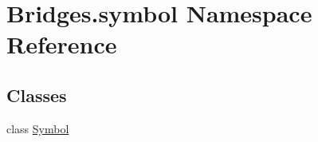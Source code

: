 \hypertarget{namespace_bridges_1_1symbol}{}\section{Bridges.\+symbol Namespace Reference}
\label{namespace_bridges_1_1symbol}
\subsection*{Classes}
\begin{DoxyCompactItemize}
\item 
class \mbox{\hyperlink{class_bridges_1_1symbol_1_1_symbol}{Symbol}}
\end{DoxyCompactItemize}
